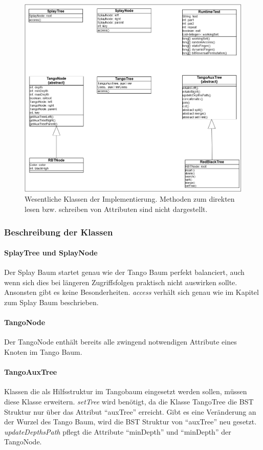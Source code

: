 \documentclass[a4paper,12pt]{article}
\begin{document}
\begin{figure}[h]
\centering
\includegraphics[width=1\textwidth]{"Medien/laufzeittest/klassen"}
\caption{Wesentliche Klassen der Implementierung. Methoden zum direkten lesen bzw. schreiben von Attributen sind nicht dargestellt. }
\label{fig:klassen}
\end{figure}
   
\subsubsection{Beschreibung der Klassen }

\paragraph{SplayTree und SplayNode}
Der Splay Baum startet genau wie der Tango Baum perfekt balanciert, auch wenn sich dies bei längeren Zugriffsfolgen praktisch nicht auswirken sollte. Ansonsten gibt es keine Besonderheiten. \textit{access} verhält sich genau wie im Kapitel zum Splay Baum beschrieben.

\paragraph{TangoNode}
Der TangoNode enthält bereits alle zwingend notwendigen Attribute eines Knoten im Tango Baum. 

\paragraph{TangoAuxTree}
Klassen die als Hilfsstruktur im Tangobaum eingesetzt werden sollen, müssen diese Klasse erweitern. \textit{setTree} wird benötigt, da die Klasse TangoTree die BST Struktur nur über das Attribut \enquote{auxTree} erreicht. Gibt es eine Veränderung an der Wurzel des Tango Baum, wird die BST Struktur von \enquote{auxTree} neu gesetzt. \textit{updateDepthsPath} pflegt die Attribute \enquote{minDepth} und \enquote{minDepth} der TangoNode.
\end{document}
